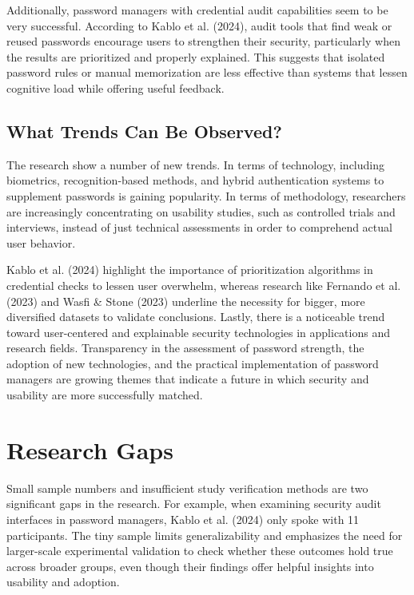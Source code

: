 \documentclass[12pt,a4paper]{article}
\begin{document}
\vspace{0.4cm}

Additionally, password managers with credential audit capabilities seem to be very successful. According to Kablo et al. (2024), audit tools that find weak or reused passwords encourage users to strengthen their security, particularly when the results are prioritized and properly explained. This suggests that isolated password rules or manual memorization are less effective than systems that lessen cognitive load while offering useful feedback.

\subsection{What Trends Can Be Observed?}

The research show a number of new trends. In terms of technology, including biometrics, recognition-based methods, and hybrid authentication systems to supplement passwords is gaining popularity. In terms of methodology, researchers are increasingly concentrating on usability studies, such as controlled trials and interviews, instead of just technical assessments in order to comprehend actual user behavior.

\vspace{0.4cm}
Kablo et al. (2024) highlight the importance of prioritization algorithms in credential checks to lessen user overwhelm, whereas research like Fernando et al. (2023) and Wasfi \& Stone (2023) underline the necessity for bigger, more diversified datasets to validate conclusions. Lastly, there is a noticeable trend toward user-centered and explainable security technologies in applications and research fields. Transparency in the assessment of password strength, the adoption of new technologies, and the practical implementation of password managers are growing themes that indicate a future in which security and usability are more successfully matched.



\section{Research Gaps}

Small sample numbers and insufficient study verification methods are two significant gaps in the research. For example, when examining security audit interfaces in password managers, Kablo et al. (2024) only spoke with 11 participants. The tiny sample limits generalizability and emphasizes the need for larger-scale experimental validation to check whether these outcomes hold true across broader groups, even though their findings offer helpful insights into usability and adoption.
\end{document}
